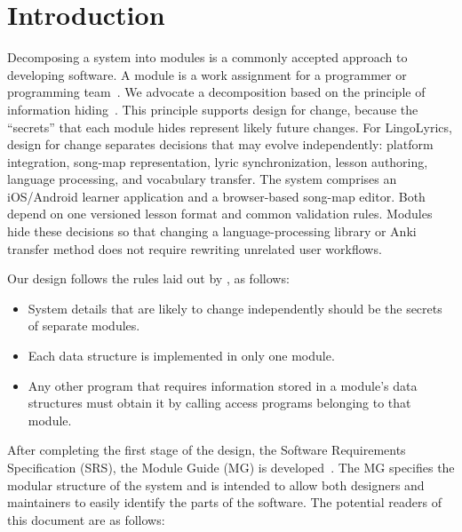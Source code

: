 \documentclass[12pt, titlepage]{article}
\begin{document}
\newpage

\tableofcontents

\listoftables

\listoffigures

\newpage


\section{Introduction}

Decomposing a system into modules is a commonly accepted approach to developing
software.  A module is a work assignment for a programmer or programming
team~\citep{ParnasEtAl1984}.  We advocate a decomposition
based on the principle of information hiding~\citep{Parnas1972a}.  This
principle supports design for change, because the ``secrets'' that each module
hides represent likely future changes.  For LingoLyrics, design for change separates decisions that may evolve
independently: platform integration, song-map representation, lyric
synchronization, lesson authoring, language processing, and vocabulary
transfer. The system comprises an iOS/Android learner application and a
browser-based song-map editor. Both depend on one versioned lesson format
and common validation rules. Modules hide these decisions so that changing a
language-processing library or Anki transfer method does not require
rewriting unrelated user workflows.  

Our design follows the rules laid out by \citet{ParnasEtAl1984}, as follows:
\begin{itemize}
\item System details that are likely to change independently should be the
  secrets of separate modules.
\item Each data structure is implemented in only one module.
\item Any other program that requires information stored in a module's data
  structures must obtain it by calling access programs belonging to that module.
\end{itemize}

After completing the first stage of the design, the Software Requirements
Specification (SRS), the Module Guide (MG) is developed~\citep{ParnasEtAl1984}. The MG
specifies the modular structure of the system and is intended to allow both
designers and maintainers to easily identify the parts of the software.  The
potential readers of this document are as follows:
\end{document}
